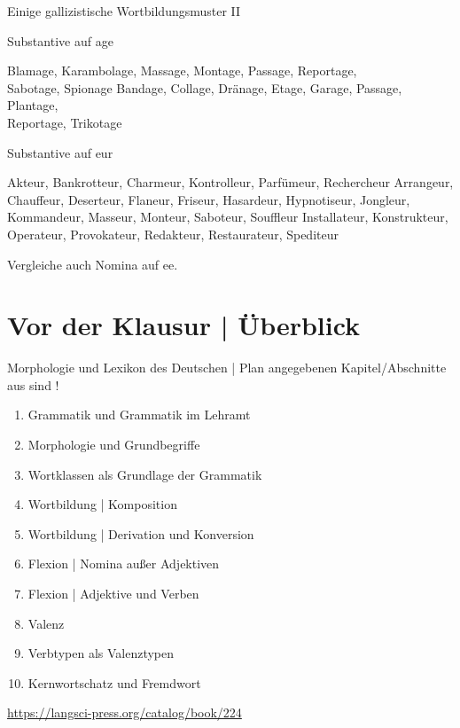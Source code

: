 \begin{frame}
  {Einige gallizistische Wortbildungsmuster II}
  \onslide<+->
  \onslide<+->
  \begin{exe}
    \ex \alert{Substantive auf age}
    \begin{xlist}
      \ex \small Blamage, Karambolage, Massage, Montage, Passage, Reportage,\\
      Sabotage, Spionage
      \ex \small Bandage, Collage, Dränage, Etage, Garage, Passage, Plantage,\\
      Reportage, Trikotage
    \end{xlist}
    \onslide<+->
    \ex \alert{Substantive auf eur}
    \begin{xlist}
      \ex \small Akteur, Bankrotteur, Charmeur, Kontrolleur, Parfümeur, Rechercheur
      \ex \small Arrangeur, Chauffeur, Deserteur, Flaneur, Friseur, Hasardeur, Hypnotiseur, Jongleur, Kommandeur, Masseur, Monteur, Saboteur, Souffleur
      \ex \small Installateur, Konstrukteur, Operateur, Provokateur, Redakteur, Restaurateur, Spediteur
    \end{xlist}
  \end{exe}
  \onslide<+->
  \Viertelzeile
  Vergleiche auch Nomina auf \alert{ee}.
\end{frame}

\ifdefined\TITLE
  \section{Vor der Klausur | Überblick}

  \begin{frame}
    {Morphologie und Lexikon des Deutschen | Plan}
     angegebenen Kapitel\slash Abschnitte aus  sind !\\
    \Halbzeile
    \begin{enumerate}
      \item Grammatik und Grammatik im Lehramt 
      \item Morphologie und Grundbegriffe 
      \item Wortklassen als Grundlage der Grammatik 
      \item Wortbildung | Komposition 
      \item Wortbildung | Derivation und Konversion 
      \item Flexion | Nomina außer Adjektiven 
      \item Flexion | Adjektive und Verben 
      \item Valenz 
      \item Verbtypen als Valenztypen 
      \item Kernwortschatz und Fremdwort 
    \end{enumerate}
    \Halbzeile
    \centering 
    \url{https://langsci-press.org/catalog/book/224}
  \end{frame}
\fi


